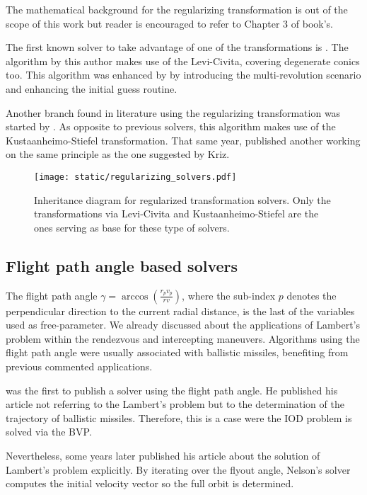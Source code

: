 The mathematical background for the regularizing transformation is out of the
scope of this work but reader is encouraged to refer to Chapter 3 of
\cite{celletti2002} book's.

The first known solver to take advantage of one of the transformations is
\cite{simo1973}. The algorithm by this author makes use of the Levi-Civita,
covering degenerate conics too. This algorithm was enhanced by \cite{torre2018}
by introducing the multi-revolution scenario and enhancing the initial guess routine.

Another branch found in literature using the regularizing transformation was
started by \cite{kriz1976}. As opposite to previous solvers, this algorithm
makes use of the Kustaanheimo-Stiefel transformation. That same year,
\cite{jezewski1976} published another working on the same principle as the one
suggested by Kriz.

\vspace{0.5cm}
\begin{figure}[h]
  \centering
  \texttt{[image: static/regularizing\_solvers.pdf]}
  \caption{Inheritance diagram for regularized transformation solvers. Only the
    transformations via Levi-Civita and Kustaanheimo-Stiefel are the ones serving
    as base for these type of solvers.}
  \label{fig:regularizing_solvers}
\end{figure}


\subsection{Flight path angle based solvers}

The flight path angle $\gamma = \arccos{\left(\frac{r_p v_p}{r v} \right)}$,
where the sub-index $p$ denotes the perpendicular direction to the current radial
distance, is the last of the variables used as free-parameter. We already
discussed about the applications of Lambert's problem within the rendezvous and
intercepting maneuvers. Algorithms using the flight path angle were usually
associated with ballistic missiles, benefiting from previous commented
applications.

\cite{wheelon1959} was the first to publish a solver using the flight path
angle. He published his article not referring to the Lambert's problem but to
the determination of the trajectory of ballistic missiles. Therefore, this is a
case were the IOD problem is solved via the BVP.

Nevertheless, some years later \cite{nelson1992} published his article about the
solution of Lambert's problem explicitly. By iterating over the flyout angle,
Nelson's solver computes the initial velocity vector so the full orbit is
determined.

